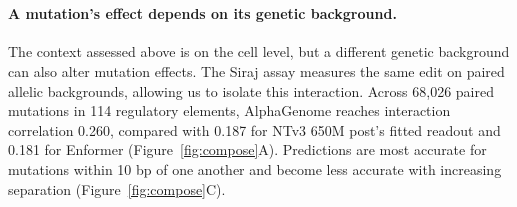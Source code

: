 
\section{}
\label{sec:genetic-interactions}




\paragraph{A mutation's effect depends on its genetic background.}
The context assessed above is on the cell level, but a different genetic background can also alter mutation effects.
The Siraj assay measures the same edit on paired
allelic backgrounds, allowing us to isolate this interaction.
Across 68,026 paired mutations in 114 regulatory elements,
AlphaGenome reaches interaction correlation 0.260, compared with
0.187 for NTv3 650M post's fitted readout and 0.181 for Enformer
(Figure~\ref{fig:compose}A). Predictions are most accurate for
mutations within 10 bp of one another and become less accurate
with increasing separation (Figure~\ref{fig:compose}C).

